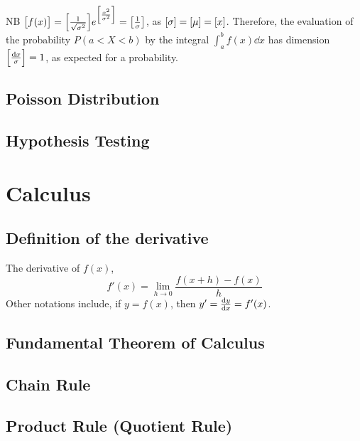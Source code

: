 \documentclass[fleqn,a4paper,11pt]{article}
\begin{document}
    NB \(\bqty{f(x)} =
        \bqty{\frac 1{\sqrt{\sigma^2}}}
        e^{\bqty{\frac{x^2}{\sigma^2}}}
      = \bqty{\frac 1\sigma}\), as
    \(\bqty{\sigma} = \bqty{\mu} = \bqty{x}\). Therefore, the
    evaluation of the probability \(P(a < X < b)\) by the integral
    \(\int_a^bf(x) \dd{x}\) has dimension
    \(\bqty{\frac{\dd{x}}{\sigma}} = 1\), as expected for a probability.

    \subsection{Poisson Distribution}


    \subsection{Hypothesis Testing}


    \section{Calculus}


    \subsection{Definition of the derivative}

    The derivative of \(f(x)\),
    \begin{equation}
    f'(x) = \lim_{h \to 0} \frac{f(x + h) - f(x)}{h}
    \end{equation}
    Other notations include, if \(y = f(x)\), then \(y' = \dv{y}{x} = f'(x)\).

    \subsection{Fundamental Theorem of Calculus} \label{sec:calc_FTC}

    \subsection{Chain Rule} \label{sec:calc_chain}

    \subsection{Product Rule (Quotient Rule)} \label{sec:calc_product}
\end{document}
